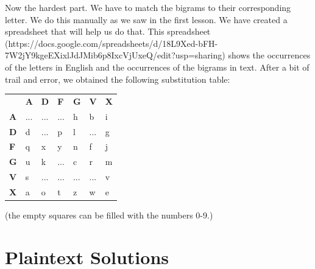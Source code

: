 \documentclass{article}
\begin{document}
Now the hardest part. We have to match the bigrams to their corresponding letter. We do this manually as we saw in the first lesson. We have created a spreadsheet that will help us do that. This spreadsheet (https://docs.google.com/spreadsheets/d/18L9Xed-bFH-7W2jY9kgeEXixlJdJMib6p8IxcVjUxeQ/edit?usp=sharing) shows the occurrences of the letters in English and the occurrences of the bigrams in text. After a bit of trail and error, we obtained the following substitution table:
\begin{table}[H]
\begin{tabular}{lllllll}
\textbf{} &
  \textbf{A} &
  \textbf{D} &
  \textbf{F} &
  \textbf{G} &
  \textbf{V} &
  \textbf{X} \\ \cline{2-7}
\multicolumn{1}{l|}{\textbf{A}} &
  \multicolumn{1}{l|}{...} &
  \multicolumn{1}{l|}{...} &
  \multicolumn{1}{l|}{...} &
  \multicolumn{1}{l|}{h} &
  \multicolumn{1}{l|}{b} &
  \multicolumn{1}{l|}{i} \\ \cline{2-7}
\multicolumn{1}{l|}{\textbf{D}} &
  \multicolumn{1}{l|}{d} &
  \multicolumn{1}{l|}{...} &
  \multicolumn{1}{l|}{p} &
  \multicolumn{1}{l|}{l} &
  \multicolumn{1}{l|}{...} &
  \multicolumn{1}{l|}{g} \\ \cline{2-7}
\multicolumn{1}{l|}{\textbf{F}} &
  \multicolumn{1}{l|}{q} &
  \multicolumn{1}{l|}{x} &
  \multicolumn{1}{l|}{y} &
  \multicolumn{1}{l|}{n} &
  \multicolumn{1}{l|}{f} &
  \multicolumn{1}{l|}{j} \\ \cline{2-7}
\multicolumn{1}{l|}{\textbf{G}} &
  \multicolumn{1}{l|}{u} &
  \multicolumn{1}{l|}{k} &
  \multicolumn{1}{l|}{...} &
  \multicolumn{1}{l|}{c} &
  \multicolumn{1}{l|}{r} &
  \multicolumn{1}{l|}{m} \\ \cline{2-7}
\multicolumn{1}{l|}{\textbf{V}} &
  \multicolumn{1}{l|}{s} &
  \multicolumn{1}{l|}{...} &
  \multicolumn{1}{l|}{...} &
  \multicolumn{1}{l|}{...} &
  \multicolumn{1}{l|}{...} &
  \multicolumn{1}{l|}{v} \\ \cline{2-7}
\multicolumn{1}{l|}{\textbf{X}} &
  \multicolumn{1}{l|}{a} &
  \multicolumn{1}{l|}{o} &
  \multicolumn{1}{l|}{t} &
  \multicolumn{1}{l|}{z} &
  \multicolumn{1}{l|}{w} &
  \multicolumn{1}{l|}{e} \\ \cline{2-7}
\end{tabular}
\end{table}
(the empty squares can be filled with the numbers 0-9.)

\newpage

\section{Plaintext Solutions}
\end{document}

